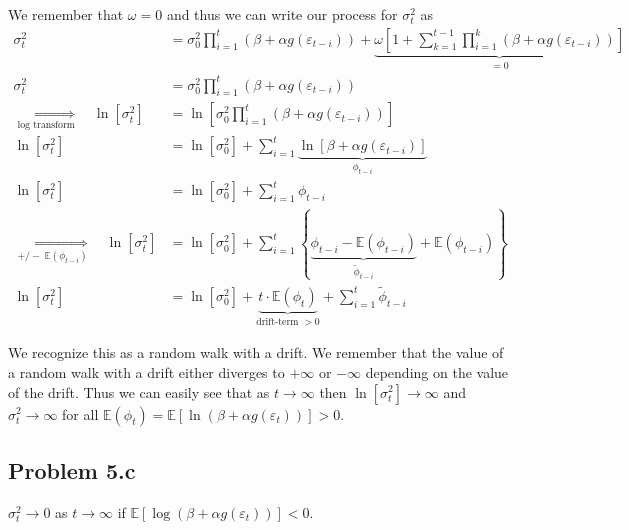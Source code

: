 \documentclass{EconHomework}
\begin{document}
We remember that $\omega=0$ and thus we can write our process for
$\sigma_{t}^{2}$ as 
\begin{align*}
    \sigma_{t}^{2}&=\sigma_{0}^{2}\prod_{i=1}^{t}\left(\beta+\alpha g\left(\varepsilon_{t-i}\right)\right)+\underbrace{\omega\left[1+\sum_{k=1}^{t-1}\prod_{i=1}^{k}\left(\beta+\alpha g\left(\varepsilon_{t-i}\right)\right)\right]}_{=0}\\
    \sigma_{t}^{2}&=\sigma_{0}^{2}\prod_{i=1}^{t}\left(\beta+\alpha g\left(\varepsilon_{t-i}\right)\right)\\
    \underset{\text{log transform}}{\Longrightarrow}\quad\ln\left[\sigma_{t}^{2}\right]&=\ln\left[\sigma_{0}^{2}\prod_{i=1}^{t}\left(\beta+\alpha g\left(\varepsilon_{t-i}\right)\right)\right]\\
    \ln\left[\sigma_{t}^{2}\right]&=\ln\left[\sigma_{0}^{2}\right]+\sum_{i=1}^{t}\underbrace{\ln\left[\beta+\alpha g\left(\varepsilon_{t-i}\right)\right]}_{\phi_{t-i}}\\
    \ln\left[\sigma_{t}^{2}\right]&=\ln\left[\sigma_{0}^{2}\right]+\sum_{i=1}^{t}\phi_{t-i}\\
    \underset{+/-\;\mathbb{E}\left(\phi_{t-i}\right)}{\Longrightarrow}\quad\ln\left[\sigma_{t}^{2}\right]&=\ln\left[\sigma_{0}^{2}\right]+\sum_{i=1}^{t}\left\{ \underbrace{\phi_{t-i}-\mathbb{E}\left(\phi_{t-i}\right)}_{\widetilde{\phi}_{t-i}}+\mathbb{E}\left(\phi_{t-i}\right)\right\} \\
    \ln\left[\sigma_{t}^{2}\right]&=\ln\left[\sigma_{0}^{2}\right]+\underbrace{t\cdot\mathbb{E}\left(\phi_{t}\right)}_{\text{drift-term }>0}+\sum_{i=1}^{t}\widetilde{\phi}_{t-i}
\end{align*}

We recognize this as a random walk with a drift. We remember that
the value of a random walk with a drift either diverges to $+\infty$
or $-\infty$ depending on the value of the drift. Thus we can easily
see that as $t\rightarrow\infty$ then $\ln\left[\sigma_{t}^{2}\right]\rightarrow\infty$
and $\sigma_{t}^{2}\rightarrow\infty$ for all $\mathbb{E}\left(\phi_{t}\right)=\mathbb{E}\left[\ln\left(\beta+\alpha g\left(\varepsilon_{t}\right)\right)\right]>0$.

\subsection{Problem 5.c}

\begin{tcolorbox}[colback=white]
$\sigma_{t}^{2}\rightarrow0$ as $t\rightarrow\infty$ if $\mathbb{E}\left[\log\left(\beta+\alpha g\left(\varepsilon_{t}\right)\right)\right]<0$.
\end{tcolorbox}
\end{document}
